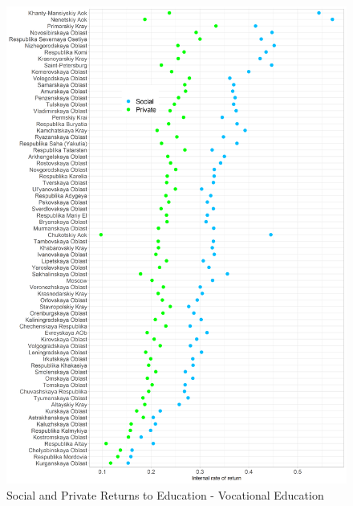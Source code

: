 \documentclass[alpha-refs]{wiley-article-05g}
\begin{document}
\begin{center}
	\begin{figure}[htbp!]
\begin{minipage}[b]{1\linewidth}
			\centering
			\includegraphics[scale=0.55]{returns_by_region_plot2.png}
		\end{minipage}
			\caption{Social and Private Returns to Education - Vocational Education}\label{fig:1.3}
	\end{figure}


\end{center}
\end{document}
